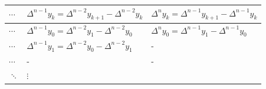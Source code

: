 \documentclass[openany]{book}
\begin{document}
\begin{longtable}[]{@{}lll@{}}
\toprule
\begin{minipage}[b]{0.07\columnwidth}\raggedright
\(\cdots\)\strut
\end{minipage} & \begin{minipage}[b]{0.43\columnwidth}\raggedright
\(\Delta^{n-1} y_k = \Delta^{n-2} y_{k+1} - \Delta^{n-2} y_k\)\strut
\end{minipage} & \begin{minipage}[b]{0.41\columnwidth}\raggedright
\(\Delta^{n} y_k = \Delta^{n-1} y_{k+1} - \Delta^{n-1} y_k\)\strut
\end{minipage}\tabularnewline
\midrule
\endhead
\begin{minipage}[t]{0.07\columnwidth}\raggedright
\(\cdots\)\strut
\end{minipage} & \begin{minipage}[t]{0.43\columnwidth}\raggedright
\(\Delta^{n-1} y_0 = \Delta^{n-2} y_{1} - \Delta^{n-2} y_0\)\strut
\end{minipage} & \begin{minipage}[t]{0.41\columnwidth}\raggedright
\(\Delta^{n} y_0 = \Delta^{n-1} y_{1} - \Delta^{n-1} y_0\)\strut
\end{minipage}\tabularnewline
\begin{minipage}[t]{0.07\columnwidth}\raggedright
\(\cdots\)\strut
\end{minipage} & \begin{minipage}[t]{0.43\columnwidth}\raggedright
\(\Delta^{n-1} y_1 = \Delta^{n-2} y_{0} - \Delta^{n-2} y_1\)\strut
\end{minipage} & \begin{minipage}[t]{0.41\columnwidth}\raggedright
-\strut
\end{minipage}\tabularnewline
\begin{minipage}[t]{0.07\columnwidth}\raggedright
\(\cdots\)\strut
\end{minipage} & \begin{minipage}[t]{0.43\columnwidth}\raggedright
-\strut
\end{minipage} & \begin{minipage}[t]{0.41\columnwidth}\raggedright
-\strut
\end{minipage}\tabularnewline
\begin{minipage}[t]{0.07\columnwidth}\raggedright
\(\ddots\)\strut
\end{minipage} & \begin{minipage}[t]{0.43\columnwidth}\raggedright
\(\vdots\)\strut

\end{minipage}
\end{longtable}
\end{document}
